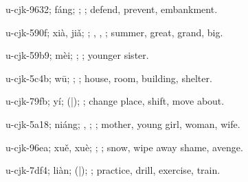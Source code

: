 \begin{multicols}{2}
{\cjkgGlue{}u-cjk-9632; fáng; \cjkgGlue{}\cjkgGlue{}\cjkgGlue{}; \cjkgGlue{}; defend, prevent, embankment.

\cjkgGlue{}u-cjk-590f; xià, jiǎ; \cjkgGlue{}; \cjkgGlue{}, \cjkgGlue{}, \cjkgGlue{}; summer, great, grand, big.

\cjkgGlue{}u-cjk-59b9; mèi; \cjkgGlue{}; \cjkgGlue{}; younger sister.

\cjkgGlue{}u-cjk-5c4b; wū; \cjkgGlue{}; \cjkgGlue{}; house, room, building, shelter.

\cjkgGlue{}u-cjk-79fb; yí; \cjkgGlue{}\cjkgGlue{}(\cjkgGlue{}|\cjkgGlue{}); \cjkgGlue{}; change place, shift, move about.

\cjkgGlue{}u-cjk-5a18; niáng; \cjkgGlue{}, \cjkgGlue{}; \cjkgGlue{}; mother, young girl, woman, wife.

\cjkgGlue{}u-cjk-96ea; xuě, xuè; \cjkgGlue{}; \cjkgGlue{}; snow, wipe away shame, avenge.

\cjkgGlue{}u-cjk-7df4; liàn; \cjkgGlue{}\cjkgGlue{}(\cjkgGlue{}|\cjkgGlue{}); \cjkgGlue{}; practice, drill, exercise, train.

}
\end{multicols}
